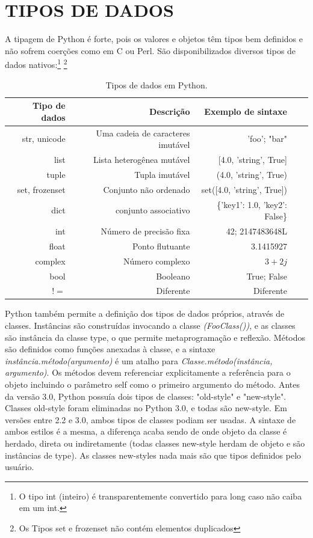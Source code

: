\section{TIPOS DE DADOS}
\label{sec:tiposDados}

A tipagem de Python é forte, pois os valores e objetos têm tipos bem definidos e não sofrem coerções como em C ou Perl.
São disponibilizados diversos tipos de dados nativos:\footnote{
    O tipo int (inteiro) é transparentemente convertido para long caso não caiba em um int.
}
\footnote{
    Os Tipos set e frozenset não contém elementos duplicados
}

\begin{table}[!htb]
    \centering
    \caption[Tipos de dados em Python]{Tipos de dados em Python.
    \label{tab:tipos-dados}}
    \begin{tabular}{rrrrr}
        \toprule
        Tipo de dados & Descrição & Exemplo de sintaxe \\
        \midrule
        str, unicode    & Uma cadeia de caracteres imutável & 'foo'; "bar"  \\
        list    & Lista heterogênea mutável & [4.0, 'string', True]  \\
        tuple    & Tupla imutável & (4.0, 'string', True)  \\
        set, frozenset    & Conjunto não ordenado & set([4.0, 'string', True])  \\
        dict    & conjunto associativo & \{'key1': 1.0, 'key2': False\}  \\
        int    & Número de precisão fixa & 42; 2147483648L \\
        float    & Ponto flutuante & 3.1415927  \\
        complex    & Número complexo & $3+2j$  \\
        bool    & Booleano & True; False  \\
        $!=$    & Diferente & Diferente  \\
        \bottomrule
    \end{tabular}
\end{table}

Python também permite a definição dos tipos de dados próprios, através de classes.
Instâncias são construídas invocando a classe \textit{(FooClass())}, e as classes são instância da classe type, o que permite metaprogramação e reflexão.
Métodos são definidos como funções anexadas à classe, e a sintaxe \textit{instância.método(argumento)} é um atalho para \textit{Classe.método(instância, argumento)}.
Os métodos devem referenciar explicitamente a referência para o objeto incluindo o parâmetro self como o primeiro argumento do método.
Antes da versão 3.0, Python possuía dois tipos de classes: "old-style" e "new-style". Classes old-style foram eliminadas no Python 3.0, e todas são new-style. Em versões entre 2.2 e 3.0, ambos tipos de classes podiam ser usadas. A sintaxe de ambos estilos é a mesma, a diferença acaba sendo de onde objeto da classe é herdado, direta ou indiretamente (todas classes new-style herdam de objeto e são instâncias de type).
As classes new-styles nada mais são que tipos definidos pelo usuário.

